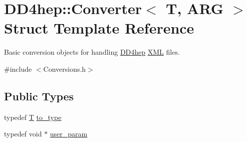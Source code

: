 \hypertarget{struct_d_d4hep_1_1_converter}{}\section{D\+D4hep\+:\+:Converter$<$ T, A\+RG $>$ Struct Template Reference}
\label{struct_d_d4hep_1_1_converter}


Basic conversion objects for handling \hyperlink{namespace_d_d4hep}{D\+D4hep} \hyperlink{namespace_d_d4hep_1_1_x_m_l}{X\+ML} files.  




{\ttfamily \#include $<$Conversions.\+h$>$}

\subsection*{Public Types}
\begin{DoxyCompactItemize}
\item 
typedef \hyperlink{class_t}{T} \hyperlink{struct_d_d4hep_1_1_converter_ab6977053b60eb411fc88ac61e7a47832}{to\+\_\+type}
\item 
typedef void $\ast$ \hyperlink{struct_d_d4hep_1_1_converter_a13a876ea9cfcadf85a3dadd32e97a834}{user\+\_\+param}
\end{DoxyCompactItemize}
